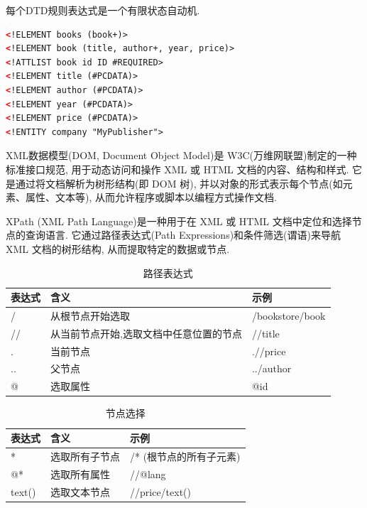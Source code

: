 每个DTD规则表达式是一个有限状态自动机.
\begin{lstlisting}[language=XML]
<!ELEMENT books (book+)>
<!ELEMENT book (title, author+, year, price)>
<!ATTLIST book id ID #REQUIRED>
<!ELEMENT title (#PCDATA)>
<!ELEMENT author (#PCDATA)>
<!ELEMENT year (#PCDATA)>
<!ELEMENT price (#PCDATA)>
<!ENTITY company "MyPublisher">
\end{lstlisting}

XML数据模型(DOM, Document Object Model)是 W3C(万维网联盟)制定的一种标准接口规范, 
用于动态访问和操作 XML 或 HTML 文档的内容、结构和样式. 
它是通过将文档解析为树形结构(即 DOM 树), 并以对象的形式表示每个节点(如元素、属性、文本等), 
从而允许程序或脚本以编程方式操作文档.

XPath (XML Path Language)是一种用于在 XML 或 HTML 文档中定位和选择节点的查询语言.
它通过路径表达式(Path Expressions)和条件筛选(谓语)来导航 XML 文档的树形结构, 
从而提取特定的数据或节点.


\begin{table}[H]
    \centering
    \begin{tabular}{|l|l|l|}
    \hline
    \textbf{表达式} & \textbf{含义} & \textbf{示例} \\
    \hline
    / & 从根节点开始选取 & /bookstore/book \\
    \hline
    // & 从当前节点开始,选取文档中任意位置的节点 & //title \\
    \hline
    . & 当前节点 & .//price \\
    \hline
    .. & 父节点 & ../author \\
    \hline
    @ & 选取属性 & @id \\
    \hline
    \end{tabular}
    \caption{路径表达式}
\end{table}

\begin{table}[H]
    \centering
    \begin{tabular}{|l|l|l|}
    \hline
    \textbf{表达式} & \textbf{含义} & \textbf{示例} \\
    \hline
    * & 选取所有子节点 & /* (根节点的所有子元素) \\
    \hline
    @* & 选取所有属性 & //@lang \\
    \hline
    text() & 选取文本节点 & //price/text() \\
    \hline
    \end{tabular}
    \caption{节点选择}
\end{table}

